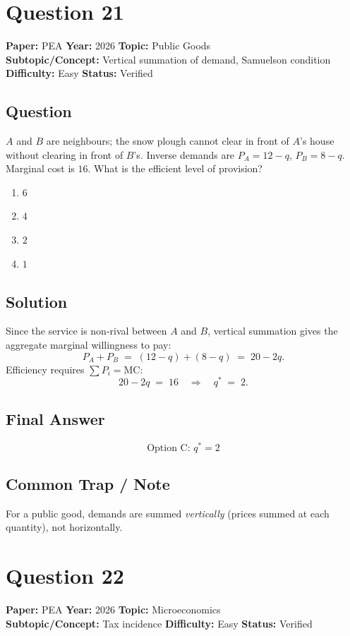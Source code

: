 \documentclass[11pt]{article}
\begin{document}
\section*{Question 21}
\textbf{Paper:} PEA \quad \textbf{Year:} 2026 \quad \textbf{Topic:} Public Goods \\
\textbf{Subtopic/Concept:} Vertical summation of demand, Samuelson condition \quad
\textbf{Difficulty:} Easy \quad \textbf{Status:} Verified

\subsection*{Question}
$A$ and $B$ are neighbours; the snow plough cannot clear in front of $A$'s house
without clearing in front of $B$'s. Inverse demands are $P_A = 12 - q$,
$P_B = 8 - q$. Marginal cost is $16$. What is the efficient level of provision?
\begin{enumerate}[label=(\Alph*)]
\item $6$ \item $4$ \item $2$ \item $1$
\end{enumerate}

\subsection*{Solution}
Since the service is non-rival between $A$ and $B$, vertical summation gives
the aggregate marginal willingness to pay:
\[
P_A + P_B \;=\; (12 - q) + (8 - q) \;=\; 20 - 2q.
\]
Efficiency requires $\sum P_i = \text{MC}$:
\[
20 - 2q \;=\; 16 \quad\Longrightarrow\quad q^* \;=\; 2.
\]

\subsection*{Final Answer}
\[
\boxed{\text{Option C: } q^* = 2}
\]

\subsection*{Common Trap / Note}
For a public good, demands are summed \emph{vertically} (prices summed at each quantity), not horizontally.

\section*{Question 22}
\textbf{Paper:} PEA \quad \textbf{Year:} 2026 \quad \textbf{Topic:} Microeconomics \\
\textbf{Subtopic/Concept:} Tax incidence \quad
\textbf{Difficulty:} Easy \quad \textbf{Status:} Verified
\end{document}

